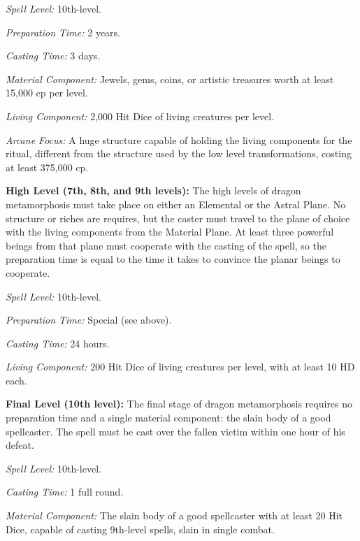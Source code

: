 {\textit{Spell Level:} 10th-level.

\textit{Preparation Time:} 2 years.

\textit{Casting Time:} 3 days.

\textit{Material Component:} Jewels, gems, coins, or artistic treasures worth at least 15,000 cp per level.

\textit{Living Component:} 2,000 Hit Dice of living creatures per level.

\textit{Arcane Focus:} A huge structure capable of holding the living components for the ritual, different from the structure used by the low level transformations, costing at least 375,000 cp.

\textbf{High Level (7th, 8th, and 9th levels):} The high levels of dragon metamorphosis must take place on either an Elemental or the Astral Plane. No structure or riches are requires, but the caster must travel to the plane of choice with the living components from the Material Plane. At least three powerful beings from that plane must cooperate with the casting of the spell, so the preparation time is equal to the time it takes to convince the planar beings to cooperate.

\textit{Spell Level:} 10th-level.

\textit{Preparation Time:} Special (see above).

\textit{Casting Time:} 24 hours.

\textit{Living Component:} 200 Hit Dice of living creatures per level, with at least 10 HD each.

\textbf{Final Level (10th level):} The final stage of dragon metamorphosis requires no preparation time and a single material component: the slain body of a good spellcaster. The spell must be cast over the fallen victim within one hour of his defeat.

\textit{Spell Level:} 10th-level.

\textit{Casting Time:} 1 full round.

\textit{Material Component:} The slain body of a good spellcaster with at least 20 Hit Dice, capable of casting 9th-level spells, slain in single combat.

}
